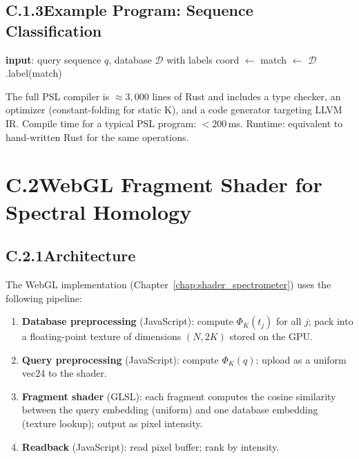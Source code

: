 \subsection*{C.1.3\quad Example Program: Sequence Classification}

\begin{algorithm}
\caption{PSL Program: Classify a sequence into a known family}
\label{alg:psl_classify}
\begin{algorithmic}[1]
\State \textbf{input}: query sequence $q$, database $\mathcal{D}$ with labels
\State coord $\gets$ 
\State match $\gets$ 
\State \Return $\mathcal{D}$.label(match)
\end{algorithmic}
\end{algorithm}

The full PSL compiler is $\approx 3,\!000$ lines of Rust and includes a type
checker, an optimizer (constant-folding for static K), and a code generator
targeting LLVM IR. Compile time for a typical PSL program: $< 200$\,ms.
Runtime: equivalent to hand-written Rust for the same operations.

\section*{C.2\quad WebGL Fragment Shader for Spectral Homology}
\label{app:shader}

\subsection*{C.2.1\quad Architecture}

The WebGL implementation (Chapter~\ref{chap:shader_spectrometer}) uses the
following pipeline:

\begin{enumerate}
  \item \textbf{Database preprocessing} (JavaScript): compute $\Phi_K(t_j)$
        for all $j$; pack into a floating-point texture of dimensions
        $(N, 2K)$ stored on the GPU.
  \item \textbf{Query preprocessing} (JavaScript): compute $\Phi_K(q)$;
        upload as a uniform vec24 to the shader.
  \item \textbf{Fragment shader} (GLSL): each fragment computes the cosine
        similarity between the query embedding (uniform) and one database
        embedding (texture lookup); output as pixel intensity.
  \item \textbf{Readback} (JavaScript): read pixel buffer; rank by intensity.
\end{enumerate}

